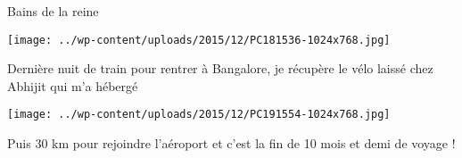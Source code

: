  \newline
 Bains de la reine \newline
 \newline
\centerline{\texttt{[image: ../wp-content/uploads/2015/12/PC181536-1024x768.jpg]} } 
 \newline
 Dernière nuit de train pour rentrer à Bangalore, je récupère le vélo laissé chez Abhijit qui m'a hébergé \newline
 \newline
\centerline{\texttt{[image: ../wp-content/uploads/2015/12/PC191554-1024x768.jpg]} } 
 \newline
 Puis 30 km pour rejoindre l'aéroport et c'est la fin de 10 mois et demi de voyage ! \newline

\newpage
 
